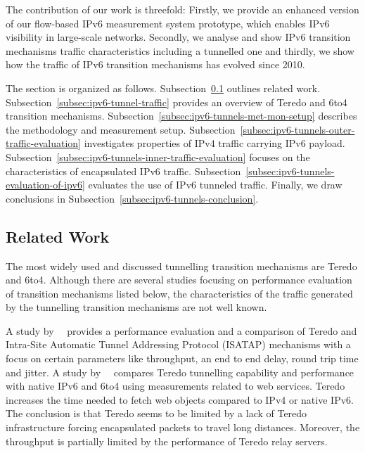 The contribution of our work is threefold: Firstly, we provide an enhanced version of our flow-based IPv6 measurement system prototype, which enables IPv6 visibility in large-scale networks. Secondly, we analyse and show IPv6 transition mechanisms traffic characteristics including a tunnelled one and thirdly, we show how the traffic of IPv6 transition mechanisms has evolved since 2010.

The section is organized as follows. Subsection~\ref{subsec:ipv6-tunnels-related-work} outlines related work. Subsection~\ref{subsec:ipv6-tunnel-traffic} provides an overview of Teredo and 6to4 transition mechanisms. Subsection~\ref{subsec:ipv6-tunnels-met-mon-setup} describes the methodology and measurement setup. Subsection~\ref{subsec:ipv6-tunnels-outer-traffic-evaluation} investigates properties of IPv4 traffic carrying IPv6 payload. Subsection~\ref{subsec:ipv6-tunnels-inner-traffic-evaluation} focuses on the characteristics of encapsulated IPv6 traffic. Subsection~\ref{subsec:ipv6-tunnels-evaluation-of-ipv6} evaluates the use of IPv6 tunneled traffic. Finally, we draw conclusions in Subsection~\ref{subsec:ipv6-tunnels-conclusion}.

\subsection{Related Work} \label{subsec:ipv6-tunnels-related-work}

The most widely used and discussed tunnelling transition mechanisms are Teredo and 6to4. Although there are several studies focusing on performance evaluation of transition mechanisms listed below, the characteristics of the traffic generated by the tunnelling transition mechanisms are not well known.

A study by~\citeauthor{Aazam-2010-Comparison}~\cite{Aazam-2010-Comparison} provides a performance evaluation and a comparison of Teredo and Intra-Site Automatic Tunnel Addressing Protocol (ISATAP) mechanisms with a focus on certain parameters like throughput, an end to end delay, round trip time and jitter. A study by~\citeauthor{Zander-2012-Investigating}~\cite{Zander-2012-Investigating} compares Teredo tunnelling capability and performance with native IPv6 and 6to4 using measurements related to web services. Teredo increases the time needed to fetch web objects compared to IPv4 or native IPv6. The conclusion is that Teredo seems to be limited by a lack of Teredo infrastructure forcing encapsulated packets to travel long distances. Moreover, the throughput is partially limited by the performance of Teredo relay servers.

